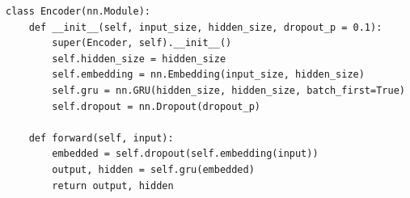 \begin{listing}
\begin{verbatim}
class Encoder(nn.Module):
    def __init__(self, input_size, hidden_size, dropout_p = 0.1):
        super(Encoder, self).__init__()
        self.hidden_size = hidden_size
        self.embedding = nn.Embedding(input_size, hidden_size)
        self.gru = nn.GRU(hidden_size, hidden_size, batch_first=True)
        self.dropout = nn.Dropout(dropout_p)

    def forward(self, input):
        embedded = self.dropout(self.embedding(input))
        output, hidden = self.gru(embedded)
        return output, hidden
\end{verbatim}
\caption{Encoder of the Seq2Seq Model}\label{lst:seq2seq_encoder}
\end{listing}
